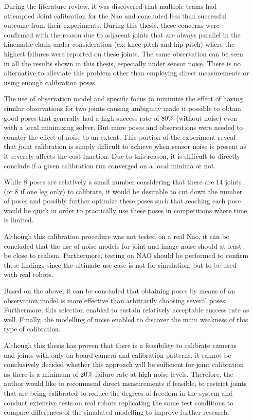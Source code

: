 \documentclass[english, printversion, nomenclature, notitle]{tuvisionthesis} %
\begin{document}
During the literature review, it was discovered that multiple teams had attempted Joint calibration for the Nao and concluded less than successful outcome from their experiments. During this thesis, these concerns were confirmed with the reason due to adjacent joints that are always parallel in the kinematic chain under consideration (ex: knee pitch and hip pitch) where the highest failures were reported on these joints. The same observation can be seen in all the results shown in this thesis, especially under sensor noise. There is no alternative to alleviate this problem other than employing direct measurements or using enough calibration poses.

The use of observation model and specific focus to minimize the effect of having similar observations for two joints causing ambiguity made it possible to obtain good poses that generally had a high success rate of 80\% (without noise) even with a local minimizing solver. But more poses and observations were needed to counter the effect of noise to an extent. This portion of the experiment reveal that joint calibration is simply difficult to achieve when sensor noise is present as it severely affects the cost function. Due to this reason, it is difficult to directly conclude if a given calibration run converged on a local minima or not.

While 8 poses are relatively a small number considering that there are 14 joints (or 8 if one leg only) to calibrate, it would be desirable to cut down the number of poses and possibly further optimize these poses such that reaching each pose would be quick in order to practically use these poses in competitions where time is limited.

Although this calibration procedure was not tested on a real Nao, it can be concluded that the use of noise models for joint and image noise should at least be close to realism. Furthermore, testing on NAO should be performed to confirm these findings since the ultimate use case is not for simulation, but to be used with real robots.

Based on the above, it can be concluded that obtaining poses by means of an observation model is more effective than arbitrarily choosing several poses. Furthermore, this selection enabled to sustain relatively acceptable success rate as well. Finally, the modelling of noise enabled to discover the main weakness of this type of calibration.

Although this thesis has proven that there is a feasibility to calibrate cameras and joints with only on-board camera and calibration patterns, it cannot be conclusively decided whether this approach will be sufficient for joint calibration as there is a minimum of 20\% failure rate at high noise levels. Therefore, the author would like to recommend direct measurements if feasible, to restrict joints that are being calibrated to reduce the degrees of freedom in the system and conduct extensive tests on real robots replicating the same test conditions to compare differences of the simulated modelling to improve further research.


{}

%
\end{document}

